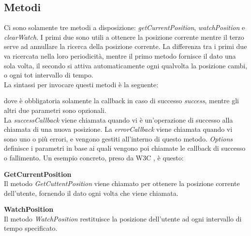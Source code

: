 \documentclass[11pt ,a4paper , twoside , openright ]{book}
\begin{document}
	\subsection{Metodi}
	Ci sono solamente tre metodi a disposizione: \textit{getCurrentPosition}, \textit{watchPosition} e \textit{clearWatch}. I primi due sono utili a ottenere la posizione corrente mentre il terzo serve ad annullare la ricerca della posizione corrente. 
	La differenza tra i primi due va ricercata nella loro periodicità, mentre il primo metodo fornisce il dato una sola volta, il secondo si attiva automaticamente ogni qualvolta la posizione cambi, o ogni tot intervallo di tempo.
	\\
	La sintassi per invocare questi metodi è la seguente:
	
	dove è obbligatoria solamente la callback in caso di successo \textit{success}, mentre gli altri due parametri sono opzionali.
	\\
	La \textit{successCallback} viene chiamata quando vi è un'operazione di successo alla chiamata di una nuova posizione.
	La \textit{errorCallback} viene chiamata quando vi sono uno o più errori, e vengono gestiti all'interno di questo metodo.
	\textit{Options} definisce i parametri in base ai quali vengono poi chiamate le callback di successo o fallimento.
	Un esempio concreto, preso da W3C \cite{rif5}, è questo:
	 
	\textbf{GetCurrentPosition}
	\\
	Il metodo \textit{GetCuttentPosition} viene chiamato per ottenere la posizione corrente dell'utente, fornendo il dato ogni volta che viene chiamata.
	
	\textbf{WatchPosition}
	\\
	Il metodo \textit{WatchPosition} restituisce la posizione dell'utente ad ogni intervallo di tempo specificato.
	
\end{document}
